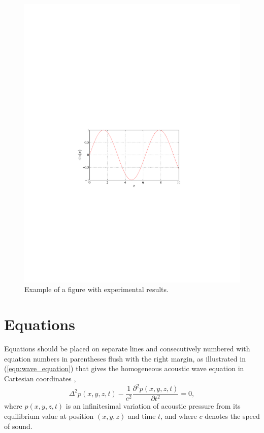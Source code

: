 \documentclass{article}
\begin{document}
\begin{sloppy}
\begin{figure}[t]
  \centering
  \centerline{\includegraphics[width=\columnwidth]{fig1a}}
  \caption{Example of a figure with experimental results.}
  \label{fig:results}
\end{figure}

\section{Equations}
\label{sec:equations}

Equations should be placed on separate lines and consecutively numbered with equation numbers in parentheses flush with the right margin, as illustrated in (\ref{eqn:wave_equation}) that gives the homogeneous acoustic wave equation in Cartesian coordinates \cite{eWilliams1999},
\begin{equation}
  \label{eqn:wave_equation}
    \Delta^2p(x,y,z,t)-
    \displaystyle\frac{1}{c^2}\frac{\partial^2p(x,y,z,t)}{\partial t^2}=0,
\end{equation}
where $p(x,y,z,t)$ is an infinitesimal variation of acoustic pressure from its equilibrium value at position $(x,y,z)$ and time $t$, and where $c$ denotes the speed of sound.


\end{sloppy}
\end{document}
